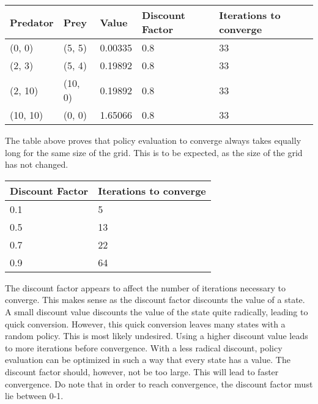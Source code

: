 \documentclass{article}
\begin{document}
\begin{center}
	\begin{tabular}{ l | l | l | l | l }
		Predator & Prey & Value & Discount Factor & Iterations to converge \\ 
		\hline
		(0, 0) & (5, 5) & 0.00335 & 0.8 & 33 \\
		(2, 3) & (5, 4) & 0.19892 & 0.8 & 33 \\
		(2, 10) & (10, 0) & 0.19892 & 0.8 & 33 \\
		(10, 10) & (0, 0) & 1.65066 & 0.8 & 33 \\	
	\end{tabular}
\end{center}

The table above proves that policy evaluation to converge always takes equally long for the same size of the grid. This is to be expected, as the size of the grid has not changed.


\begin{center}
	\begin{tabular}{ l || l }
		Discount Factor & Iterations to converge \\ 
		\hline
		0.1 & 5 \\
		0.5 & 13 \\
		0.7 & 22 \\
		0.9 & 64 \\	
	\end{tabular}
\end{center}

The discount factor appears to affect the number of iterations necessary to converge. This makes sense as the discount factor discounts the value of a state. A small discount value discounts the value of the state quite radically, leading to quick conversion. However, this quick conversion leaves many states with a random policy. This is most likely undesired. Using a higher discount value leads to more iterations before convergence. With a less radical discount, policy evaluation can be optimized in such a way that every state has a value. The discount factor should, however, not be too large. This will lead to faster convergence. Do note that in order to reach convergence, the discount factor must lie between 0-1.
\end{document}
